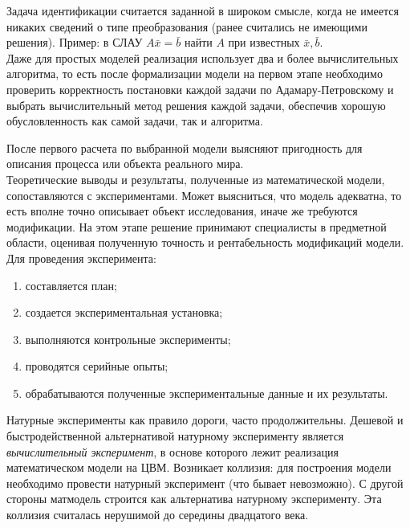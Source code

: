 \documentclass[12pt]{article}
\begin{document}
Задача идентификации считается заданной в широком смысле, когда не имеется никаких сведений о типе преобразования (ранее считались не имеющими решения). Пример: в СЛАУ $A\bar{x} = \bar{b}$ найти $A$ при известных $\bar{x}, \bar{b}$.\\


Даже для простых моделей реализация использует два и более вычислительных алгоритма, то есть после формализации модели на первом этапе необходимо проверить корректность постановки каждой задачи по Адамару-Петровскому и выбрать вычислительный метод решения каждой задачи, обеспечив хорошую обусловленность как самой задачи, так и алгоритма.

После первого расчета по выбранной модели выясняют пригодность для описания процесса или объекта реального мира.\\

Теоретические выводы и результаты, полученные из математической модели, сопоставляются с экспериментами. Может выясниться, что модель адекватна, то есть вполне точно описывает объект исследования, иначе же требуются модификации. На этом этапе решение принимают специалисты в предметной области, оценивая полученную точность и рентабельность модификаций модели.\\

Для проведения эксперимента:
\begin{enumerate}
    \item составляется план;
    \item создается экспериментальная установка;
    \item выполняются контрольные эксперименты;
    \item проводятся серийные опыты;
    \item обрабатываются полученные экспериментальные данные и их результаты.
\end{enumerate}

Натурные эксперименты как правило дороги, часто продолжительны. Дешевой и быстродейственной альтернативой натурному эксперименту является \emph{вычислительный эксперимент}, в основе которого лежит реализация математическом модели на ЦВМ. Возникает коллизия: для построения модели  необходимо провести натурный эксперимент (что бывает невозможно). С другой стороны матмодель строится как альтернатива натурному эксперименту. Эта коллизия считалась нерушимой до середины двадцатого века.
\end{document}
